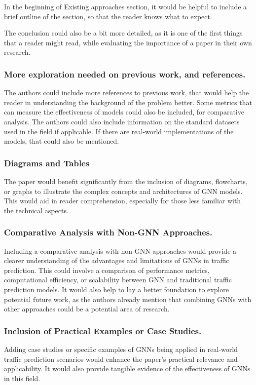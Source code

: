 \documentclass[12pt]{article}
\begin{document}
In the beginning of Existing approaches section, it would be helpful to include a brief outline of the section, so that the reader knows what to expect.

The conclusion could also be a bit more detailed, as it is one of the first things that a reader might read, while evaluating the importance
of a paper in their own research.

\subsubsection*{More exploration needed on previous work, and references.}
The authors could include more references to previous work, that would help the reader in understanding the background of the problem better.
Some metrics that can measure the effectiveness of models could also be included, for comparative analysis. The authors could also include 
information on the standard datasets used in the field if applicable. If there are real-world implementations of the models, that could also be
mentioned.

\subsubsection*{Diagrams and Tables}
The paper would benefit significantly from the inclusion of diagrams, flowcharts, or graphs to illustrate the complex concepts and architectures of 
GNN models. This would aid in reader comprehension, especially for those less familiar with the technical aspects. 


\subsubsection*{Comparative Analysis with Non-GNN Approaches.}
Including a comparative analysis with non-GNN approaches would provide a clearer understanding of the advantages and limitations of GNNs 
in traffic prediction. This could involve a comparison of performance metrics, computational efficiency, or scalability between GNN and traditional 
traffic prediction models. It would also help to lay a better foundation to explore potential future work, as the authors already mention that combining
GNNs with other approaches could be a potential area of research.

\subsubsection*{Inclusion of Practical Examples or Case Studies.}
Adding case studies or specific examples of GNNs being applied in real-world traffic prediction scenarios would enhance the paper's practical relevance 
and applicability. It would also provide tangible evidence of the effectiveness of GNNs in this field.
\end{document}
